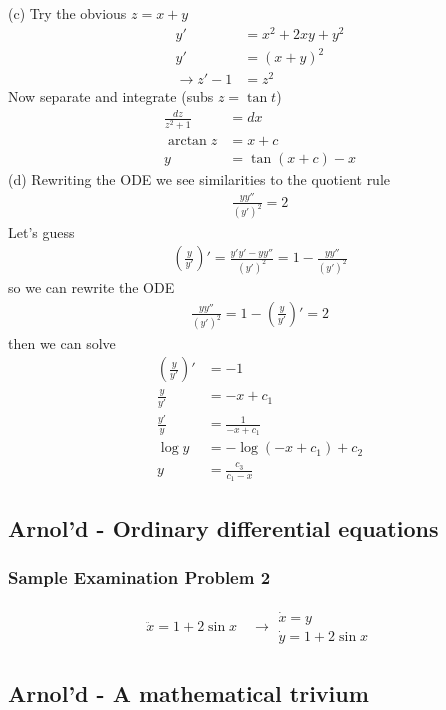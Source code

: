\documentclass[10pt,a4paper]{article}
\theoremstyle{definition}
\begin{document}
(c) Try the obvious $z=x+y$
\begin{align}
y'&=x^2+2xy+y^2\\
y'&=(x+y)^2\\
\rightarrow z'-1&=z^2
\end{align}
Now separate and integrate (subs $z=\tan t$)
\begin{align}
\frac{dz}{z^2+1}&=dx\\
\arctan z&=x+c\\
y&=\tan(x+c)-x
\end{align}
(d) Rewriting the ODE we see similarities to the quotient rule
\begin{align}
\frac{yy''}{(y')^2}=2
\end{align}
Let's guess
\begin{align}
\left(\frac{y}{y'}\right)'=\frac{y'y'-yy''}{(y')^2}=1-\frac{yy''}{(y')^2}
\end{align}
so we can rewrite the ODE
\begin{align}
\frac{yy''}{(y')^2}=1-\left(\frac{y}{y'}\right)'=2
\end{align}
then we can solve
\begin{align}
\left(\frac{y}{y'}\right)'&=-1\\
\frac{y}{y'}&=-x+c_1\\
\frac{y'}{y}&=\frac{1}{-x+c_1}\\
\log y&=-\log(-x+c_1)+c_2\\
y&=\frac{c_3}{c_1-x}
\end{align}

\subsection{{\sc Arnol'd} - Ordinary differential equations}
\subsubsection{Sample Examination Problem 2}
\begin{align}
\ddot x=1+2\sin x\quad\rightarrow
\begin{array}{l}
\dot x=y\\
\dot y=1+2\sin x
\end{array}
\end{align}

\subsection{{\sc Arnol'd} - A mathematical trivium}
\end{document}
